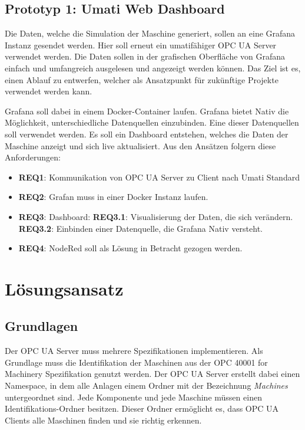 \documentclass[a4paper, 12pt, oneside, toc=listofnumbered, bibliography=totoc]{scrbook}
\begin{document}
		\subsection{Prototyp 1: Umati Web Dashboard}
		
		Die Daten, welche die Simulation der Maschine generiert, sollen an eine Grafana Instanz gesendet werden. Hier soll erneut ein umatifähiger OPC UA Server verwendet werden. Die Daten sollen in der grafischen Oberfläche von Grafana einfach und umfangreich ausgelesen und angezeigt werden können. Das Ziel ist es, einen Ablauf zu entwerfen, welcher als Ansatzpunkt für zukünftige Projekte verwendet werden kann. 
		
		Grafana soll dabei in einem Docker-Container laufen. Grafana bietet Nativ die Möglichkeit, unterschiedliche Datenquellen einzubinden. Eine dieser Datenquellen soll verwendet werden. Es soll ein Dashboard entstehen, welches die Daten der Maschine anzeigt und sich live aktualisiert. Aus den Ansätzen folgern diese Anforderungen:
		
		\begin{itemize}
			\item \textbf{REQ1}: Kommunikation von OPC UA Server zu Client nach Umati Standard
			\item \textbf{REQ2}: Grafan muss in einer Docker Instanz laufen.
			\item \textbf{REQ3}: Dashboard:
			\subitem \textbf{REQ3.1}: Visualisierung der Daten, die sich verändern.
			\subitem \textbf{REQ3.2}: Einbinden einer Datenquelle, die Grafana Nativ versteht.
			\item \textbf{REQ4}: NodeRed soll als Lösung in Betracht gezogen werden.
		\end{itemize}			
		
	\section{Lösungsansatz}
	
		\subsection{Grundlagen}
		Der OPC UA Server muss mehrere Spezifikationen implementieren. Als Grundlage muss die Identifikation der Maschinen aus der OPC 40001 for Machinery Spezifikation genutzt werden. Der OPC UA Server erstellt dabei einen Namespace, in dem alle Anlagen einem Ordner mit der Bezeichnung \textit{Machines} untergeordnet sind. Jede Komponente und jede Maschine müssen einen Identifikations-Ordner besitzen. Dieser Ordner ermöglicht es, dass OPC UA Clients alle Maschinen finden und sie richtig erkennen. 
		
\end{document}

